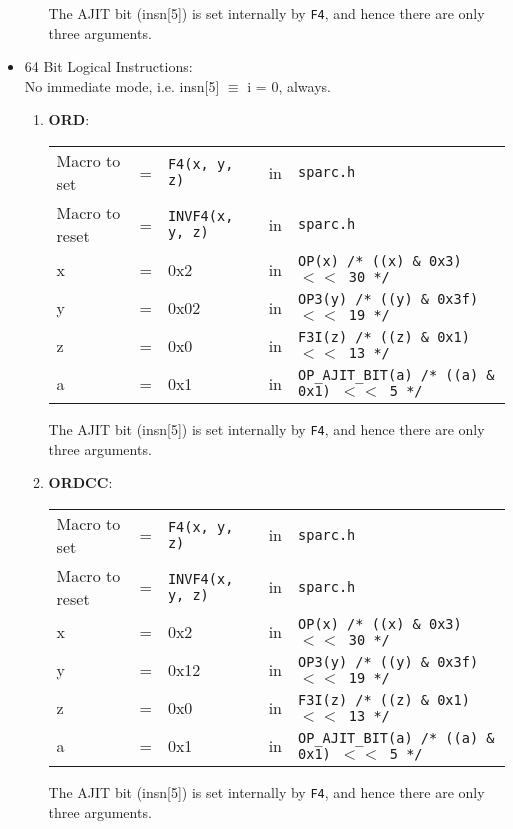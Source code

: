 \begin{itemize}
\begin{enumerate}
    The AJIT bit  (insn[5]) is set internally by  \texttt{F4}, and hence
    there are only three arguments.
  \end{enumerate}

\item {64 Bit Logical Instructions:}\\

  No immediate mode, i.e. insn[5] $\equiv$ i = 0, always.

  \begin{enumerate}
  \item \textbf{ORD}:\\
    \begin{tabular}[h]{lclcl}
      Macro to set  &=& \texttt{F4(x, y, z)} &in& \texttt{sparc.h}     \\
      Macro to reset  &=& \texttt{INVF4(x, y, z)} &in& \texttt{sparc.h}     \\
      x &=& 0x2      &in& \texttt{OP(x)  /* ((x) \& 0x3)  $<<$ 30 */} \\
      y &=& 0x02     &in& \texttt{OP3(y) /* ((y) \& 0x3f) $<<$ 19 */} \\
      z &=& 0x0      &in& \texttt{F3I(z) /* ((z) \& 0x1)  $<<$ 13 */} \\
      a &=& 0x1      &in& \texttt{OP\_AJIT\_BIT(a) /* ((a) \& 0x1)  $<<$ 5 */}
    \end{tabular}

    The AJIT bit  (insn[5]) is set internally by  \texttt{F4}, and hence
    there are only three arguments.

  \item \textbf{ORDCC}:\\
    \begin{tabular}[h]{lclcl}
      Macro to set  &=& \texttt{F4(x, y, z)} &in& \texttt{sparc.h}     \\
      Macro to reset  &=& \texttt{INVF4(x, y, z)} &in& \texttt{sparc.h}     \\
      x &=& 0x2      &in& \texttt{OP(x)  /* ((x) \& 0x3)  $<<$ 30 */} \\
      y &=& 0x12     &in& \texttt{OP3(y) /* ((y) \& 0x3f) $<<$ 19 */} \\
      z &=& 0x0      &in& \texttt{F3I(z) /* ((z) \& 0x1)  $<<$ 13 */} \\
      a &=& 0x1      &in& \texttt{OP\_AJIT\_BIT(a) /* ((a) \& 0x1)  $<<$ 5 */}
    \end{tabular}

    The AJIT bit  (insn[5]) is set internally by  \texttt{F4}, and hence
    there are only three arguments.


\end{enumerate}
\end{itemize}

